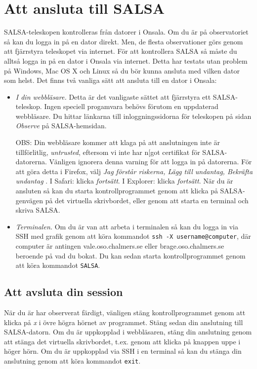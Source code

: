 \section{Att ansluta till SALSA} 
\label{sect:connect}
SALSA-teleskopen kontrolleras från datorer i Onsala. Om du är på 
observatoriet så kan du logga in på en dator direkt. Men, de flesta observationer
görs genom att fjärrstyra teleskopet via internet. För att kontrollera SALSA
så måste du alltså logga in på en dator i Onsala via internet. Detta har 
testats utan problem på Windows, Mac OS X och Linux så du bör kunna ansluta 
med  vilken dator som helst. Det finns två vanliga sätt att ansluta
till en dator i Onsala:

\begin{itemize}
	\item{\emph{I din webbläsare.} Detta är det vanligaste
			sättet att fjärrstyra ett SALSA-teleskop. Ingen speciell 
			progamvara behövs förutom en uppdaterad webbläsare. Du hittar länkarna
			till inloggningssidorna för teleskopen på sidan \emph{Observe} på 
			SALSA-hemsidan. 

			OBS: Din webbläsare kommer att klaga på att anslutningen inte är 
			tillförlitlig, \emph{untrusted}, eftersom vi inte har n[got
			certifikat för SALSA-datorerna. Vänligen ignorera denna varning
			för att logga in på datorerna. För att göra detta i Firefox, välj 
			\emph{Jag förstår riskerna, Lägg till undantag, Bekräfta undantag
			}. I Safari: klicka \emph{fortsätt}. I Explorer: klicka \emph{fortsätt}.  
			När du är ansluten så kan du starta kontrollprogrammet genom
			att klicka på SALSA-genvägen på det virtuella skrivbordet, eller genom att
			starta en terminal och skriva SALSA. 
		}
\item{\emph{Terminalen.} Om du är van att arbeta i terminalen så kan du 
		logga in via SSH med grafik genom att köra kommandot 
		{\tt ssh -X username@computer}, där computer är antingen vale.oso.chalmers.se eller
		brage.oso.chalmers.se beroende på vad du bokat.  Du kan sedan starta kontrollprogrammet
		genom att köra kommandot {\tt  SALSA}.}
\end{itemize}

\subsection{Att avsluta din session}
När du är har observerat färdigt, vänligen stäng kontrollprogrammet genom
att klicka på \emph{x} i övre högra hörnet av programmet. Stäng sedan din 
anslutning till SALSA-datorn. Om du är uppkopplad i webbläsaren, stäng din 
anslutning genom att stänga det virtuella skrivbordet, t.ex. genom att
klicka på knappen uppe i höger hörn. 
Om du är uppkopplad via SSH i en terminal så kan du stänga din anslutning
genom att köra kommandot {\tt exit}.

